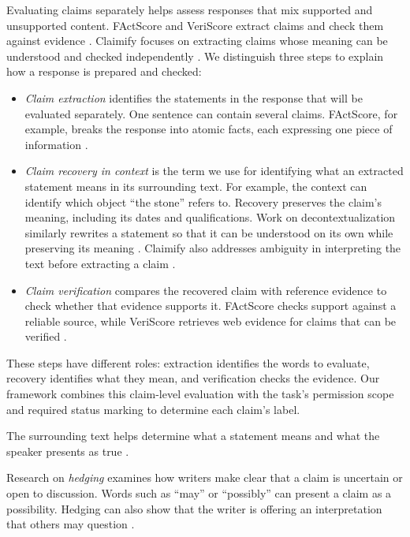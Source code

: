 \documentclass{clv2025}
\begin{document}
Evaluating claims separately helps assess responses that mix supported and
unsupported content.
FActScore and VeriScore extract claims and check them against evidence
\citep{min_factscore_2023,song_veriscore_2024}. Claimify focuses on extracting
claims whose meaning can be understood and checked independently
\citep{metropolitansky_claimify_2025}.
We distinguish three steps to explain how a response is prepared and checked:
\begin{itemize}
\item \emph{Claim extraction} identifies the statements in the response
that will be evaluated separately. One sentence can contain several claims.
FActScore, for example, breaks the response into atomic facts, each expressing
one piece of information \citep{min_factscore_2023}.
\item \emph{Claim recovery in context} is the term we use for identifying
what an extracted statement means in its surrounding text. For example,
the context can identify which object ``the stone'' refers to. Recovery
preserves the claim's meaning, including its dates and qualifications.
Work on decontextualization similarly rewrites a statement so that it can
be understood on its own while preserving its meaning
\citep{choi_decontextualization_2021}. Claimify also addresses ambiguity in
interpreting the text before extracting a claim
\citep{metropolitansky_claimify_2025}.
\item \emph{Claim verification} compares the recovered claim with
reference evidence to check whether that evidence supports it. FActScore
checks support against a reliable source, while VeriScore retrieves web
evidence for claims that can be verified
\citep{min_factscore_2023,song_veriscore_2024}.
\end{itemize}
These steps have different roles: extraction identifies the words to
evaluate, recovery identifies what they mean, and verification checks
the evidence. Our framework combines this claim-level evaluation with
the task's permission scope and required status marking to determine
each claim's label.

The surrounding text helps determine what a statement means and what the
speaker presents as true \citep{stalnaker_assertion_1978,clark_using_1996}.

Research on \emph{hedging} examines how writers make clear that a claim
is uncertain or open to discussion. Words such as ``may'' or ``possibly''
can present a claim as a possibility. Hedging can also show that the writer
is offering an interpretation that others may question
\citep{hyland_hedging_1996}.
\end{document}
